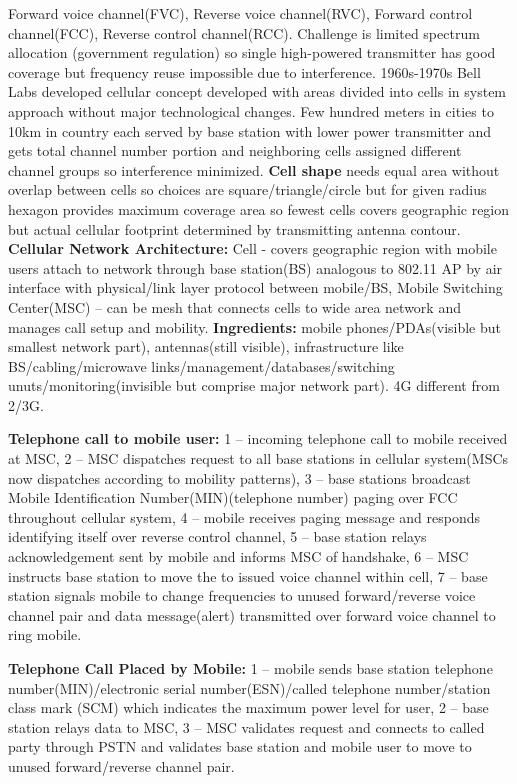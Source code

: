 \documentclass[9pt]{extarticle}
\begin{document}
\begin{multicols}{2}
Forward voice channel(FVC), Reverse voice channel(RVC), Forward control channel(FCC), Reverse control channel(RCC). Challenge is limited spectrum allocation (government regulation) so single high-powered transmitter has good coverage but frequency reuse impossible due to interference. 1960s-1970s Bell Labs developed cellular concept developed with areas divided into cells in system approach without major technological changes. Few hundred meters in cities to 10km in country each served by base station with lower power transmitter and gets total channel number portion and neighboring cells assigned different channel groups so interference minimized. \textbf{Cell shape} needs equal area without overlap between cells so choices are square/triangle/circle but for given radius hexagon provides maximum coverage area so fewest cells covers geographic region but actual cellular footprint determined by transmitting antenna contour. \textbf{Cellular Network Architecture:} Cell - covers geographic region with mobile users attach to network through base station(BS) analogous to 802.11 AP by air interface with physical/link layer protocol between mobile/BS, Mobile Switching Center(MSC) – can be mesh that connects cells to wide area network and manages call setup and mobility. \textbf{Ingredients: }mobile phones/PDAs(visible but smallest network part), antennas(still visible), infrastructure like BS/cabling/microwave links/management/databases/switching unuts/monitoring(invisible but comprise major network part). 4G different from 2/3G.

\textbf{Telephone call to mobile user:} 1 – incoming telephone call to mobile received at MSC, 2 – MSC dispatches request to all base stations in cellular system(MSCs now dispatches according to mobility patterns), 3 – base stations broadcast Mobile Identification Number(MIN)(telephone number) paging over FCC throughout cellular system, 4 – mobile receives paging message and responds identifying itself over reverse control channel, 5 – base station relays acknowledgement sent by mobile and informs MSC of handshake, 6 – MSC instructs base station to move the to issued voice channel within cell, 7 – base station signals mobile to change frequencies to unused forward/reverse voice channel pair and data message(alert) transmitted over forward voice channel to ring mobile.

\textbf{Telephone Call Placed by Mobile: }1 – mobile sends base station telephone number(MIN)/electronic serial number(ESN)/called telephone number/station class mark (SCM) which indicates the
maximum power level for user, 2 – base station relays data to MSC, 3 – MSC validates request and connects to called party through PSTN and validates base station and mobile user to move to unused forward/reverse channel pair.


\end{multicols}
\end{document}
